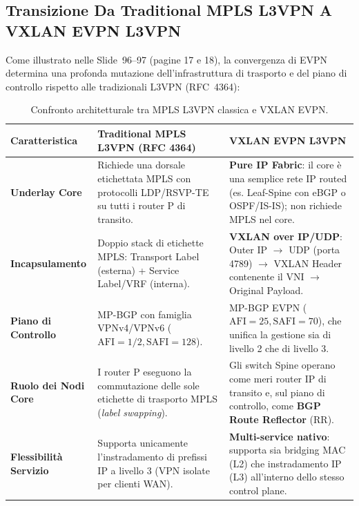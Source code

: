 \documentclass[11pt, a4paper]{article}
\begin{document}
\subsection{Transizione Da Traditional MPLS L3VPN A VXLAN EVPN L3VPN}

Come illustrato nelle Slide~96--97 (pagine 17 e 18), la convergenza di EVPN determina una profonda mutazione dell'infrastruttura di trasporto e del piano di controllo rispetto alle tradizionali L3VPN (RFC~4364):


\begin{table}[H]
\centering
\small
\begin{tabularx}{\textwidth}{l p{6.5cm} X}
\toprule
\textbf{Caratteristica} & \textbf{Traditional MPLS L3VPN (RFC 4364)} & \textbf{VXLAN EVPN L3VPN} \\
\midrule
\textbf{Underlay Core} &
Richiede una dorsale etichettata MPLS con protocolli LDP/RSVP-TE su tutti i router P di transito. &
\textbf{Pure IP Fabric}: il core è una semplice rete IP routed (es. Leaf-Spine con eBGP o OSPF/IS-IS); non richiede MPLS nel core. \\
\addlinespace
\textbf{Incapsulamento} &
Doppio stack di etichette MPLS: Transport Label (esterna) + Service Label/VRF (interna). &
\textbf{VXLAN over IP/UDP}: Outer IP $\to$ UDP (porta 4789) $\to$ VXLAN Header contenente il VNI $\to$ Original Payload. \\
\addlinespace
\textbf{Piano di Controllo} &
MP-BGP con famiglia VPNv4/VPNv6 ($\text{AFI} = 1/2, \text{SAFI} = 128$). &
MP-BGP EVPN ($\text{AFI} = 25, \text{SAFI} = 70$), che unifica la gestione sia di livello 2 che di livello 3. \\
\addlinespace
\textbf{Ruolo dei Nodi Core} &
I router P eseguono la commutazione delle sole etichette di trasporto MPLS (\emph{label swapping}). &
Gli switch Spine operano come meri router IP di transito e, sul piano di controllo, come \textbf{BGP Route Reflector} (RR). \\
\addlinespace
\textbf{Flessibilità Servizio} &
Supporta unicamente l'instradamento di prefissi IP a livello 3 (VPN isolate per clienti WAN). &
\textbf{Multi-service nativo}: supporta sia bridging MAC (L2) che instradamento IP (L3) all'interno dello stesso control plane. \\
\bottomrule
\end{tabularx}
\caption{Confronto architetturale tra MPLS L3VPN classica e VXLAN EVPN.}
\end{table}
\end{document}
